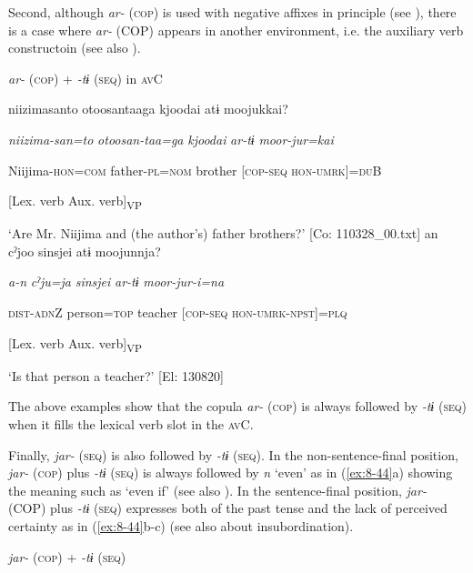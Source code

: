   Second, although \textit{ar-} (\textsc{cop}) is used with negative affixes in principle (see ), there is a case where \textit{ar-} (COP) appears in another environment, i.e. the auxiliary verb constructoin (see also ).

\ea\label{ex:8-43}
  \textit{ar-} (\textsc{cop}) + \textit{{}-tɨ} (\textsc{seq}) in \textsc{av}C

\ea {\US}
\glll   {\textbar}niizimasanto  otoosan{\textbar}taaga  {\textbar}kjoodai{\textbar}  atɨ  moojukkai?

      \textit{niizima-san=to}  \textit{otoosan-taa=ga}  \textit{kjoodai}  \textit{ar-tɨ}  \textit{moor-jur=kai}

      Niijima{}-\textsc{hon}=\textsc{com}  father{}-\textsc{pl}=\textsc{nom}  brother  [\textsc{cop}-\textsc{seq}  \textsc{hon}-\textsc{umrk}]=\textsc{du}B

            [Lex. verb  Aux. verb]\textsubscript{VP}

\glt ‘Are Mr. Niijima and (the author’s) father brothers?’ [Co: 110328\_00.txt]
\ex {\TM}
\glll  an  cˀjoo  sinsjei  atɨ  moojunnja?

      \textit{a-n}  \textit{cˀju=ja}  \textit{sinsjei}  \textit{ar-tɨ}  \textit{moor-jur-i=na}

      \textsc{dist}-\textsc{adn}Z  person=\textsc{top}  teacher  [\textsc{cop}-\textsc{seq}  \textsc{hon}-\textsc{umrk}-\textsc{npst}]=\textsc{plq}

            [Lex. verb  Aux. verb]\textsubscript{VP}

\glt ‘Is that person a teacher?’ [El: 130820]

The above examples show that the copula \textit{ar-} (\textsc{cop}) is always followed by \textit{{}-tɨ} (\textsc{seq}) when it fills the lexical verb slot in the \textsc{av}C.

  Finally, \textit{jar-} (\textsc{seq}) is also followed by \textit{{}-tɨ} (\textsc{seq}). In the non-sentence-final position, \textit{jar-} (\textsc{cop}) plus \textit{{}-tɨ} (\textsc{seq}) is always followed by \textit{n} ‘even’ as in (\ref{ex:8-44}a) showing the meaning such as ‘even if’ (see also ). In the sentence-final position, \textit{jar-} (COP) plus \textit{{}-tɨ} (\textsc{seq}) expresses both of the past tense and the lack of perceived certainty as in (\ref{ex:8-44}b-c) (see also  about insubordination).

\ea\label{ex:8-44}
  \textit{jar-} (\textsc{cop}) + \textit{{}-tɨ} (\textsc{seq})

